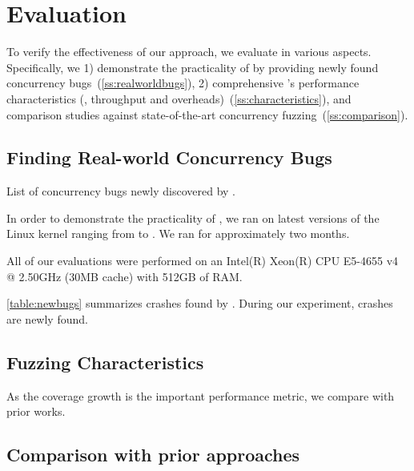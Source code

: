 \section{Evaluation}
\label{s:eval}

To verify the effectiveness of our approach, we evaluate \sys in
various aspects. Specifically, we 1) demonstrate the practicality of
\sys by providing newly found concurrency
bugs~(\autoref{ss:realworldbugs}), 2) comprehensive \sys's performance
characteristics (\eg, throughput and
overheads)~(\autoref{ss:characteristics}), and comparison studies
against state-of-the-art concurrency fuzzing~(\autoref{ss:comparison}).

\subsection{Finding Real-world Concurrency Bugs}
\label{ss:realworldbugs}

\begin{table*}[t]
  
  \centering
  \caption{List of concurrency bugs newly discovered by \sys.}
  \label{table:newbugs}
\end{table*}

In order to demonstrate the practicality of \sys, we ran \sys on
latest versions of the Linux kernel ranging from \XXX{} to \XXX{}.  We
ran \sys for approximately two months.

%
All of our evaluations were performed on an Intel(R) Xeon(R) CPU
E5-4655 v4 @ 2.50GHz (30MB cache) with 512GB of RAM.


%
\autoref{table:newbugs} summarizes crashes found by \sys. During our
experiment, \totalbugs crashes are newly found.
%






\subsection{Fuzzing Characteristics}
\label{ss:characteristics}

As the coverage growth is the important performance metric, we compare
\sys with prior works.




\subsection{Comparison with prior approaches}
\label{ss:comparison}

